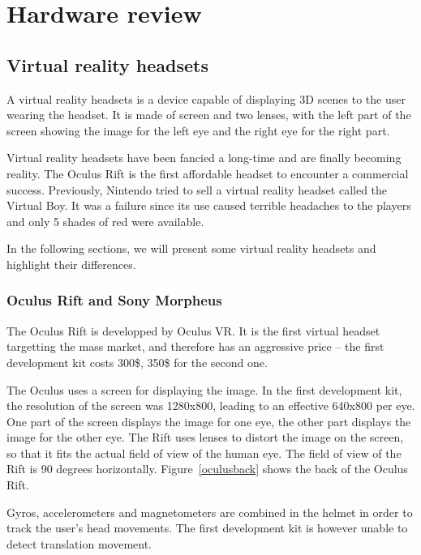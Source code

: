 \documentclass[12pt]{article}
\begin{document}
\section{Hardware review}
\subsection{Virtual reality headsets}
A virtual reality headsets is a device capable of displaying 3D scenes to the user wearing the headset. It is made of screen and two lenses, with the left part of the screen showing the image for the left eye and the right eye for the right part.

Virtual reality headsets have been fancied a long-time and are finally becoming reality. The Oculus Rift is the first affordable headset to encounter a commercial success. Previously, Nintendo tried to sell a virtual reality headset called the Virtual Boy. It was a failure since its use caused terrible headaches to the players and only 5 shades of red were available.

In the following sections, we will present some virtual reality headsets and highlight their differences.

\subsubsection{Oculus Rift and Sony Morpheus}
The Oculus Rift is developped by Oculus VR. It is the first virtual headset targetting the mass market, and therefore has an aggressive price -- the first development kit costs 300\$, 350\$ for the second one.

The Oculus uses a screen for displaying the image. In the first development kit, the resolution of the screen was 1280x800, leading to an effective 640x800 per eye. One part of the screen displays the image for one eye, the other part displays the image for the other eye. The Rift uses lenses to distort the image on the screen, so that it fits the actual field of view of the human eye. The field of view of the Rift is 90 degrees horizontally. Figure~\ref{oculusback} shows the back of the Oculus Rift.

Gyros, accelerometers and magnetometers are combined in the helmet in order to track the user's head movements. The first development kit is however unable to detect translation movement.
\end{document}
